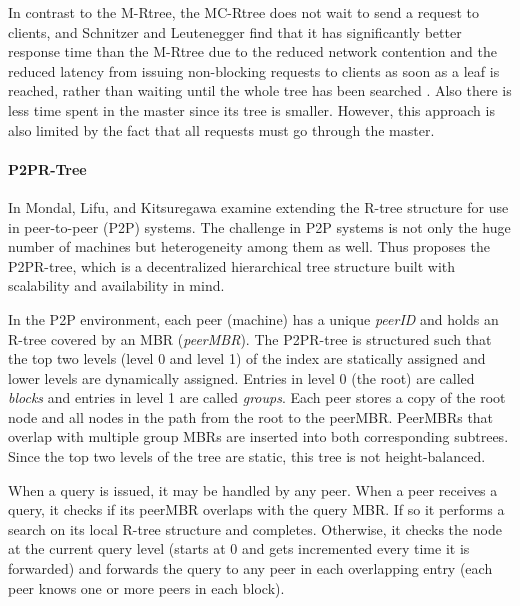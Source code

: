 In contrast to the M-Rtree, the MC-Rtree does not wait to send a request to
clients, and Schnitzer and Leutenegger find that it has significantly better 
response time than the M-Rtree due to the reduced network contention and the 
reduced latency from issuing non-blocking requests to clients as soon as a leaf 
is reached, rather than waiting until the whole tree has been searched  
\cite{schnitzer1999master}. Also there is less time spent in the master since its 
tree is smaller. However, this approach is also limited by the fact that all 
requests must go through the master.



\paragraph{P2PR-Tree}
In \cite{mondal2005p2pr} Mondal, Lifu, and Kitsuregawa examine extending the 
R-tree structure for use in peer-to-peer (P2P) systems. The challenge in P2P 
systems is not only the huge number of machines but heterogeneity among them as 
well. Thus \cite{mondal2005p2pr} proposes the P2PR-tree, which is a 
decentralized hierarchical tree structure built with scalability and availability
in mind. 

In the P2P environment, each peer (machine) has a unique \emph{peerID} and holds
an R-tree covered by an MBR (\emph{peerMBR}). The P2PR-tree is structured
such that the top two levels (level 0 and level 1) of the index are statically 
assigned and lower levels are dynamically assigned. Entries in level 0 (the root)
are called \emph{blocks} and entries in level 1 are called \emph{groups}. Each 
peer stores a copy of the root node and all nodes in the path from the root to 
the peerMBR. PeerMBRs that overlap with multiple group MBRs are inserted into 
both corresponding subtrees. Since the top two levels of the tree are static, 
this tree is not height-balanced\cite{mondal2005p2pr}.

When a query is issued, it may be handled by any peer. When a peer receives a 
query, it checks if its peerMBR overlaps with the query MBR. If so it performs 
a search on its local R-tree structure and completes. Otherwise, it checks the 
node at the current query level (starts at 0 and gets incremented every time it
is forwarded) and forwards the query to any peer in each overlapping entry (each
peer knows one or more peers in each block).

